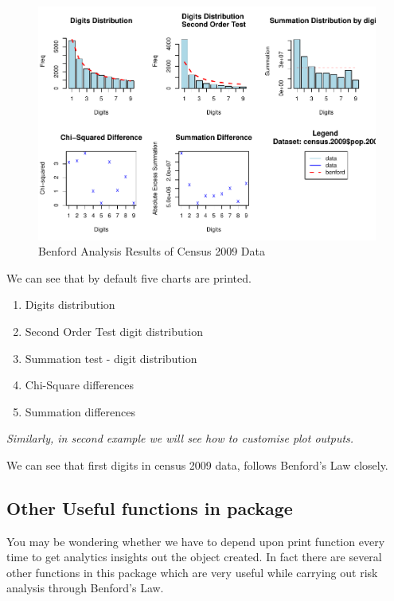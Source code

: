 \documentclass[
]{book}
\providecommand{\tightlist}{%
  \setlength{\itemsep}{0pt}\setlength{\parskip}{0pt}}
\begin{document}
\begin{figure}

{\centering \includegraphics{DauR_files/figure-latex/cenbenplot-1} 

}

\caption{Benford Analysis Results of Census 2009 Data}\label{fig:cenbenplot}
\end{figure}

We can see that by default five charts are printed.

\begin{enumerate}
\def\labelenumi{\arabic{enumi}.}
\tightlist
\item
  Digits distribution
\item
  Second Order Test digit distribution
\item
  Summation test - digit distribution
\item
  Chi-Square differences
\item
  Summation differences
\end{enumerate}

\emph{Similarly, in second example we will see how to customise plot outputs.}

We can see that first digits in census 2009 data, follows Benford's Law closely.

\hypertarget{other-useful-functions-in-package}{%
\subsection{Other Useful functions in package}\label{other-useful-functions-in-package}}

You may be wondering whether we have to depend upon print function every time to get analytics insights out the object created. In fact there are several other functions in this package which are very useful while carrying out risk analysis through Benford's Law.
\end{document}
